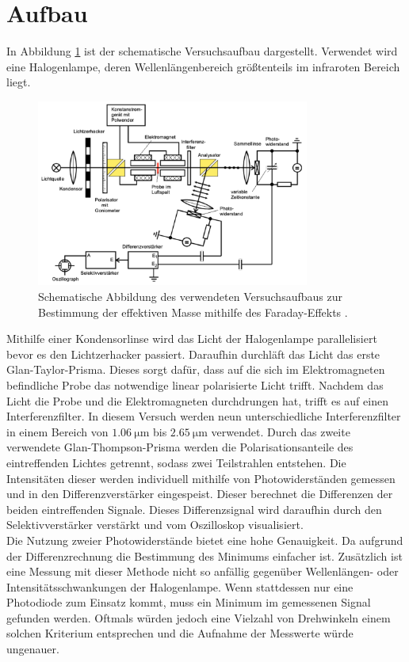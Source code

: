 \section{Aufbau}
In Abbildung \ref{fig:schemAufbau} ist der schematische Versuchsaufbau dargestellt. Verwendet wird
eine Halogenlampe, deren Wellenlängenbereich größtenteils im infraroten Bereich liegt.
\begin{figure}[H]
    \centering
    \includegraphics[width=0.8\textwidth]{images/SchemAufbau.pdf}
    \caption{Schematische Abbildung des verwendeten Versuchsaufbaus zur Bestimmung der effektiven
     Masse mithilfe des Faraday-Effekts \cite{anleitung}.}
    \label{fig:schemAufbau}
\end{figure} \noindent
Mithilfe einer Kondensorlinse wird das Licht der Halogenlampe parallelisiert bevor es den Lichtzerhacker passiert.
Daraufhin durchläft das Licht das erste Glan-Taylor-Prisma. Dieses sorgt dafür, dass auf die sich im
Elektromagneten befindliche Probe das notwendige linear polarisierte Licht trifft.
Nachdem das Licht die Probe und die Elektromagneten durchdrungen hat, trifft es auf einen Interferenzfilter.
In diesem Versuch werden neun unterschiedliche Interferenzfilter in einem Bereich von $\SI{1.06}{\micro\meter}$ bis $\SI{2.65}{\micro\meter}$
verwendet. Durch das zweite verwendete Glan-Thompson-Prisma werden die Polarisationsanteile des
eintreffenden Lichtes getrennt, sodass zwei Teilstrahlen entstehen. Die Intensitäten dieser werden
individuell mithilfe von Photowiderständen gemessen und in den Differenzverstärker eingespeist. Dieser
berechnet die Differenzen der beiden eintreffenden Signale.
Dieses Differenzsignal wird daraufhin durch den Selektivverstärker verstärkt und vom Oszilloskop visualisiert.\\
Die Nutzung zweier Photowiderstände bietet eine hohe Genauigkeit. Da aufgrund der Differenzrechnung die
Bestimmung des Minimums einfacher ist. Zusätzlich ist eine Messung mit dieser Methode nicht so anfällig
gegenüber Wellenlängen- oder Intensitätsschwankungen der Halogenlampe.
Wenn stattdessen nur eine Photodiode zum Einsatz kommt, muss ein Minimum im gemessenen Signal gefunden
werden. Oftmals würden jedoch eine Vielzahl von Drehwinkeln einem solchen Kriterium entsprechen
und die Aufnahme der Messwerte würde ungenauer.

